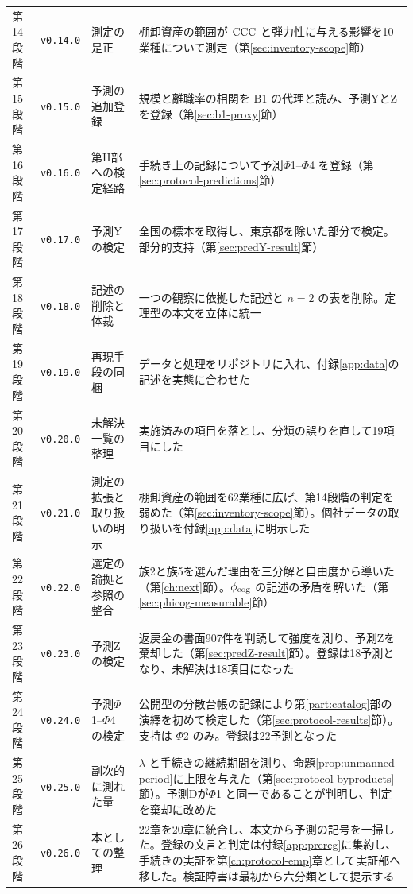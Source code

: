 \begin{longtable}{@{}ll>{\raggedright\arraybackslash}p{}>{\raggedright\arraybackslash}p{}@{}}
第14段階 & \texttt{v0.14.0} & 測定の是正 & 棚卸資産の範囲が $\mathrm{CCC}$ と弾力性に与える影響を10業種について測定（第\ref{sec:inventory-scope}節） \\
第15段階 & \texttt{v0.15.0} & 予測の追加登録 & 規模と離職率の相関を B1 の代理と読み、予測YとZを登録（第\ref{sec:b1-proxy}節） \\
第16段階 & \texttt{v0.16.0} & 第II部への検定経路 & 手続き上の記録について予測$\Phi$1--$\Phi$4 を登録（第\ref{sec:protocol-predictions}節） \\
第17段階 & \texttt{v0.17.0} & 予測Yの検定 & 全国の標本を取得し、東京都を除いた部分で検定。部分的支持（第\ref{sec:predY-result}節） \\
第18段階 & \texttt{v0.18.0} & 記述の削除と体裁 & 一つの観察に依拠した記述と $n=2$ の表を削除。定理型の本文を立体に統一 \\
第19段階 & \texttt{v0.19.0} & 再現手段の同梱 & データと処理をリポジトリに入れ、付録\ref{app:data}の記述を実態に合わせた \\
第20段階 & \texttt{v0.20.0} & 未解決一覧の整理 & 実施済みの項目を落とし、分類の誤りを直して19項目にした \\
第21段階 & \texttt{v0.21.0} & 測定の拡張と取り扱いの明示 & 棚卸資産の範囲を62業種に広げ、第14段階の判定を弱めた（第\ref{sec:inventory-scope}節）。個社データの取り扱いを付録\ref{app:data}に明示した \\
第22段階 & \texttt{v0.22.0} & 選定の論拠と参照の整合 & 族2と族5を選んだ理由を三分解と自由度から導いた（第\ref{ch:next}節）。$\phi_{\rm cog}$ の記述の矛盾を解いた（第\ref{sec:phicog-measurable}節） \\
第23段階 & \texttt{v0.23.0} & 予測Zの検定 & 返戻金の書面907件を判読して強度を測り、予測Zを棄却した（第\ref{sec:predZ-result}節）。登録は18予測となり、未解決は18項目になった \\
第24段階 & \texttt{v0.24.0} & 予測$\Phi$1--$\Phi$4 の検定 & 公開型の分散台帳の記録により第\ref{part:catalog}部の演繹を初めて検定した（第\ref{sec:protocol-results}節）。支持は $\Phi$2 のみ。登録は22予測となった \\
第25段階 & \texttt{v0.25.0} & 副次的に測れた量 & $\lambda$ と手続きの継続期間を測り、命題\ref{prop:unmanned-period}に上限を与えた（第\ref{sec:protocol-byproducts}節）。予測Dが$\Phi$1 と同一であることが判明し、判定を棄却に改めた \\
第26段階 & \texttt{v0.26.0} & 本としての整理 & 22章を20章に統合し、本文から予測の記号を一掃した。登録の文言と判定は付録\ref{app:prereg}に集約し、手続きの実証を第\ref{ch:protocol-emp}章として実証部へ移した。検証障害は最初から六分類として提示する \\

\end{longtable}
